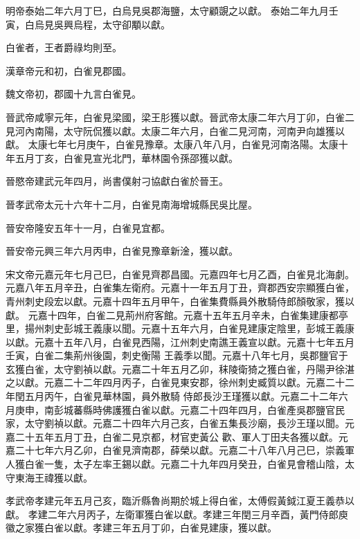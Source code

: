 \begin{pinyinscope}
 明帝泰始二年六月丁巳，白烏見吳郡海鹽，太守顧覬之以獻。
 泰始二年九月壬寅，白烏見吳興烏程，太守卻顒以獻。



 白雀者，王者爵祿均則至。



 漢章帝元和初，白雀見郡國。



 魏文帝初，郡國十九言白雀見。



 晉武帝咸寧元年，白雀見梁國，梁王肜獲以獻。晉武帝太康二年六月丁卯，白雀二見河內南陽，太守阮侃獲以獻。太康二年六月，白雀二見河南，河南尹向雄獲以獻。
 太康七年七月庚午，白雀見豫章。太康八年八月，白雀見河南洛陽。太康十年五月丁亥，白雀見宣光北門，華林園令孫邵獲以獻。



 晉愍帝建武元年四月，尚書僕射刁協獻白雀於晉王。



 晉孝武帝太元十六年十二月，白雀見南海增城縣民吳比屋。



 晉安帝隆安五年十一月，白雀見宜都。



 晉安帝元興三年六月丙申，白雀見豫章新淦，獲以獻。



 宋文帝元嘉元年七月己巳，白雀見齊郡昌國。元嘉四年七月乙酉，白雀見北海劇。元嘉八年五月辛丑，白雀集左衛府。元嘉十一年五月丁丑，齊郡西安宗顯獲白雀，青州刺史段宏以獻。元嘉十四年五月甲午，白雀集費縣員外散騎侍郎顏敬家，獲以獻。
 元嘉十四年，白雀二見荊州府客館。元嘉十五年五月辛未，白雀集建康都亭里，揚州刺史彭城王義康以聞。元嘉十五年六月，白雀見建康定陰里，彭城王義康以獻。元嘉十五年八月，白雀見西陽，江州刺史南譙王義宣以獻。元嘉十七年五月壬寅，白雀二集荊州後園，刺史衡陽
 王義季以聞。元嘉十八年七月，吳郡鹽官于玄獲白雀，太守劉禎以獻。元嘉二十年五月乙卯，秣陵衛猗之獲白雀，丹陽尹徐湛之以獻。元嘉二十二年四月丙子，白雀見東安郡，徐州刺史臧質以獻。元嘉二十二年閏五月丙午，白雀見華林園，員外散騎
 侍郎長沙王瑾獲以獻。元嘉二十二年六月庚申，南彭城蕃縣時佛護獲白雀以獻。元嘉二十四年四月，白雀產吳郡鹽官民家，太守劉禎以獻。元嘉二十四年六月己亥，白雀五集長沙廟，長沙王瑾以聞。元嘉二十五年五月丁丑，白雀二見京都，材官吏黃公
 歡、軍人丁田夫各獲以獻。元嘉二十七年六月乙卯，白雀見濟南郡，薛榮以獻。元嘉二十八年八月己巳，崇義軍人獲白雀一隻，太子左率王錫以獻。元嘉二十九年四月癸丑，白雀見會稽山陰，太守東海王禕獲以獻。



 孝武帝孝建元年五月己亥，臨沂縣魯尚期於城上得白雀，太傅假黃鉞江夏王義恭以獻。
 孝建二年六月丙子，左衛軍獲白雀以獻。孝建三年閏三月辛酉，黃門侍郎庾徽之家獲白雀以獻。孝建三年五月丁卯，白雀見建康，獲以獻。




\end{pinyinscope}
